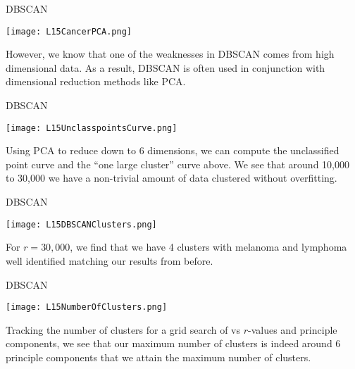 \documentclass[10pt, table, dvipsnames,xcdraw,handout]{beamer}
\begin{document}
\begin{frame}[fragile]{DBSCAN}
  \begin{minipage}[t][0.5\textheight][t]{\textwidth}
	\centering \texttt{[image: L15CancerPCA.png]} 
  \end{minipage}
  \vfill
\begin{minipage}[t][0.5\textheight][t]{\textwidth}
However, we know that one of the weaknesses in DBSCAN comes from high dimensional data. As a result, DBSCAN is often used in conjunction with dimensional reduction methods like PCA.
\end{minipage}
\end{frame}




\begin{frame}[fragile]{DBSCAN}
  \begin{minipage}[t][0.5\textheight][t]{\textwidth}
	\centering \texttt{[image: L15UnclasspointsCurve.png]} 
  \end{minipage}
  \vfill
\begin{minipage}[t][0.5\textheight][t]{\textwidth}
Using PCA to reduce down to 6 dimensions, we can compute the unclassified point curve and the ``one large cluster'' curve above. We see that around 10,000 to 30,000 we have a non-trivial amount of data clustered without overfitting. 
\end{minipage}
\end{frame}


\begin{frame}[fragile]{DBSCAN}
  \begin{minipage}[t][0.5\textheight][t]{\textwidth}
	\centering \texttt{[image: L15DBSCANClusters.png]} 
  \end{minipage}
  \vfill
\begin{minipage}[t][0.5\textheight][t]{\textwidth}
For $r=30,000$, we find that we have 4 clusters with melanoma and lymphoma well identified matching our results from before. 
\end{minipage}
\end{frame}


\begin{frame}[fragile]{DBSCAN}
  \begin{minipage}[t][0.5\textheight][t]{\textwidth}
	\centering \texttt{[image: L15NumberOfClusters.png]} 
  \end{minipage}
  \vfill
\begin{minipage}[t][0.5\textheight][t]{\textwidth}
Tracking the number of clusters for a grid search of vs $r$-values and principle components, we see that our maximum number of clusters is indeed around 6 principle components that we attain the maximum number of clusters. 
\end{minipage}
\end{frame}
\end{document}
